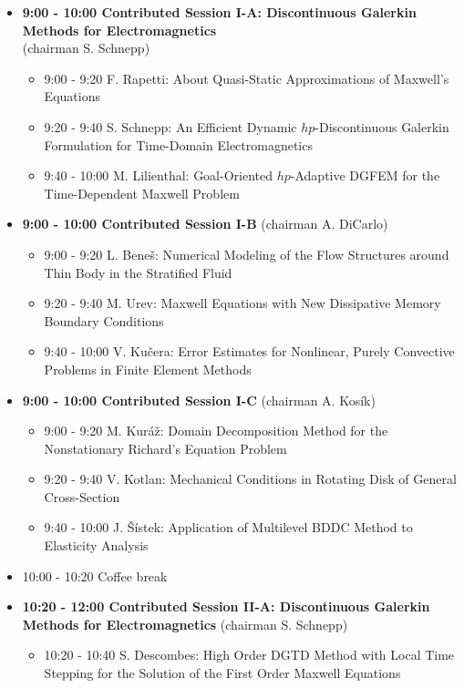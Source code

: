 \documentclass[10pt, A4]{article}%
\begin{document}
\begin{itemize}    
  \item {\bf 9:00 - 10:00 Contributed Session I-A: Discontinuous Galerkin Methods for Electromagnetics} \\(chairman S. Schnepp) 
  \begin{itemize}
    \item 9:00 - 9:20 F. Rapetti: About Quasi-Static Approximations of Maxwell's Equations
    \item 9:20 - 9:40 S. Schnepp: An Efficient Dynamic $hp$-Discontinuous Galerkin Formulation for Time-Domain Electromagnetics
    \item 9:40 - 10:00 M. Lilienthal: Goal-Oriented $hp$-Adaptive DGFEM for the Time-Dependent Maxwell Problem
  \end{itemize}
  \item {\bf 9:00 - 10:00 Contributed Session I-B} (chairman A. DiCarlo) 
  \begin{itemize}
    \item 9:00 - 9:20 L. Bene\v{s}: Numerical Modeling of the Flow Structures around Thin Body in the Stratified Fluid
    \item 9:20 - 9:40 M. Urev: Maxwell Equations with New Dissipative Memory Boundary Conditions
    \item 9:40 - 10:00 V. Ku\v{c}era: Error Estimates for Nonlinear, Purely Convective Problems in Finite Element Methods
  \end{itemize}
    \item {\bf 9:00 - 10:00 Contributed Session I-C} (chairman A. Kos\'{i}k) 
  \begin{itemize}
    \item 9:00 - 9:20 M. Kur\'{a}\v{z}: Domain Decomposition Method for the Nonstationary Richard's Equation Problem  
    \item 9:20 - 9:40 V. Kotlan: Mechanical Conditions in Rotating Disk of General Cross-Section
    \item 9:40 - 10:00 J. \v{S}\'{i}stek: Application of Multilevel BDDC Method to Elasticity Analysis
  \end{itemize}
  \item 10:00 - 10:20 Coffee break
  \item {\bf 10:20 - 12:00 Contributed Session II-A: Discontinuous Galerkin Methods for Electromagnetics} (chairman S. Schnepp) 
  \begin{itemize}
    \item 10:20 - 10:40 S. Descombes: High Order DGTD Method with Local Time Stepping for the Solution of the First Order Maxwell Equations

\end{itemize}
\end{itemize}
\end{document}
